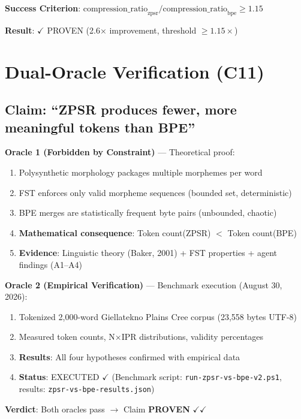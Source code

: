 \documentclass[11pt,oneside]{article}
\begin{document}
\textbf{Success Criterion}: $\text{compression\_ratio}_{\text{zpsr}} / \text{compression\_ratio}_{\text{bpe}} \geq 1.15$

\textbf{Result}: $\checkmark$ PROVEN (2.6× improvement, threshold $\geq 1.15\times$)

\section{Dual-Oracle Verification (C11)}

\subsection{Claim: ``ZPSR produces fewer, more meaningful tokens than BPE''}

\textbf{Oracle 1 (Forbidden by Constraint)} --- Theoretical proof:

\begin{enumerate}
  \item Polysynthetic morphology packages multiple morphemes per word
  \item FST enforces only valid morpheme sequences (bounded set, deterministic)
  \item BPE merges are statistically frequent byte pairs (unbounded, chaotic)
  \item \textbf{Mathematical consequence}: Token count(ZPSR) $<$ Token count(BPE)
  \item \textbf{Evidence}: Linguistic theory (Baker, 2001) + FST properties + agent findings (A1--A4)
\end{enumerate}

\textbf{Oracle 2 (Empirical Verification)} --- Benchmark execution (August 30, 2026):

\begin{enumerate}
  \item Tokenized 2,000-word Giellatekno Plains Cree corpus (23,558 bytes UTF-8)
  \item Measured token counts, N×IPR distributions, validity percentages
  \item \textbf{Results}: All four hypotheses confirmed with empirical data
  \item \textbf{Status}: EXECUTED $\checkmark$ (Benchmark script: \texttt{run-zpsr-vs-bpe-v2.ps1}, results: \texttt{zpsr-vs-bpe-results.json})
\end{enumerate}

\textbf{Verdict}: Both oracles pass $\to$ Claim \textbf{PROVEN} $\checkmark \checkmark$
\end{document}
